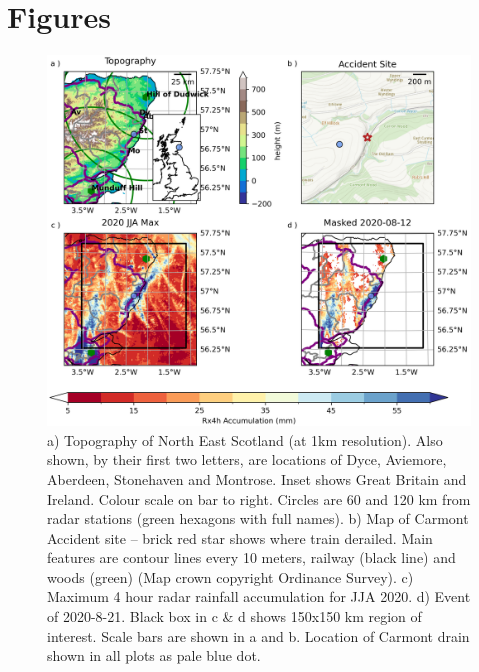 \documentclass[11pt,a4paper]{article}
\begin{document}
\section*{Figures}
\begin{figure}[ht!] %
	
	\centering
	\includegraphics[width=\linewidth]{carmont_geog_group}
	\caption{a) Topography of North East Scotland (at 1km resolution). Also shown, by their first two letters, are locations of Dyce, Aviemore, Aberdeen, Stonehaven and Montrose. Inset shows Great Britain and Ireland. Colour scale on bar to right. Circles are  60 and 120 km from radar stations (green hexagons with full names). b)  Map of Carmont Accident site -- brick red star shows where train derailed. Main features are contour lines every 10 meters, railway (black line) and woods (green) (Map crown copyright Ordinance Survey).  c) Maximum 4 hour radar rainfall accumulation  for JJA 2020. d) Event of 2020-8-21.  Black box in c \& d shows 150x150 km region of interest. Scale bars are shown in a and b. Location of Carmont drain shown in all plots as pale blue dot.  }
	\label{fig:carmont_geog_group}
\end{figure}
\clearpage
\end{document}
